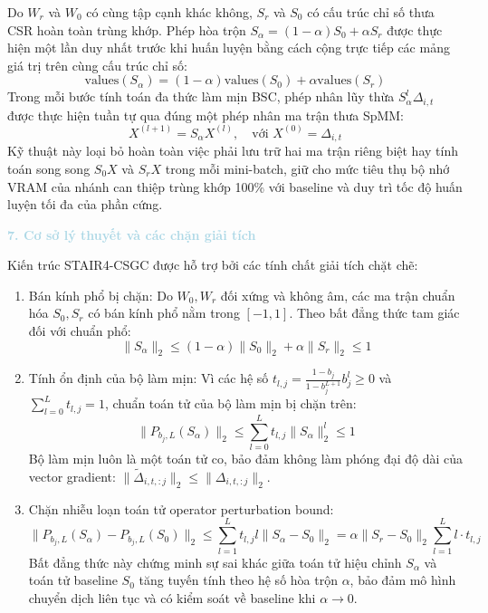 Do $W_r$ và $W_0$ có cùng tập cạnh khác không, $S_r$ và $S_0$ có cấu trúc chỉ số thưa CSR hoàn toàn trùng khớp. Phép hòa trộn $S_\alpha = (1 - \alpha)S_0 + \alpha S_r$ được thực hiện một lần duy nhất trước khi huấn luyện bằng cách cộng trực tiếp các mảng giá trị trên cùng cấu trúc chỉ số:
\begin{equation}
\text{values}(S_\alpha) = (1 - \alpha) \text{values}(S_0) + \alpha \text{values}(S_r)
\end{equation}
Trong mỗi bước tính toán đa thức làm mịn BSC, phép nhân lũy thừa $S_\alpha^l \Delta_{i, t}$ được thực hiện tuần tự qua đúng một phép nhân ma trận thưa SpMM:
\begin{equation}
X^{(l+1)} = S_\alpha X^{(l)}, \quad \text{với } X^{(0)} = \Delta_{i, t}
\end{equation}
Kỹ thuật này loại bỏ hoàn toàn việc phải lưu trữ hai ma trận riêng biệt hay tính toán song song $S_0 X$ và $S_r X$ trong mỗi mini-batch, giữ cho mức tiêu thụ bộ nhớ VRAM của nhánh can thiệp trùng khớp 100\% với baseline và duy trì tốc độ huấn luyện tối đa của phần cứng.

\noindent\textcolor{lightblue}{\textbf{7. Cơ sở lý thuyết và các chặn giải tích}}

Kiến trúc STAIR4-CSGC được hỗ trợ bởi các tính chất giải tích chặt chẽ:
\begin{enumerate}[leftmargin=*]
    \item Bán kính phổ bị chặn: Do $W_0, W_r$ đối xứng và không âm, các ma trận chuẩn hóa $S_0, S_r$ có bán kính phổ nằm trong $[-1, 1]$. Theo bất đẳng thức tam giác đối với chuẩn phổ:
    \begin{equation}
    \|S_\alpha\|_2 \le (1 - \alpha) \|S_0\|_2 + \alpha \|S_r\|_2 \le 1
    \end{equation}
    \item Tính ổn định của bộ làm mịn: Vì các hệ số $t_{l, j} = \frac{1 - b_j}{1 - b_j^{L+1}} b_j^l \ge 0$ và $\sum_{l=0}^L t_{l, j} = 1$, chuẩn toán tử của bộ làm mịn bị chặn trên:
    \begin{equation}
    \|P_{b_j, L}(S_\alpha)\|_2 \le \sum_{l=0}^{L} t_{l, j} \|S_\alpha\|_2^l \le 1
    \end{equation}
    Bộ làm mịn luôn là một toán tử co, bảo đảm không làm phóng đại độ dài của vector gradient: $\|\tilde{\Delta}_{i, t, :j}\|_2 \le \|\Delta_{i, t, :j}\|_2$.
    \item Chặn nhiễu loạn toán tử operator perturbation bound:
    \begin{equation}
    \|P_{b_j, L}(S_\alpha) - P_{b_j, L}(S_0)\|_2 \le \sum_{l=1}^{L} t_{l, j} l \|S_\alpha - S_0\|_2 = \alpha \|S_r - S_0\|_2 \sum_{l=1}^{L} l \cdot t_{l, j}
    \end{equation}
    Bất đẳng thức này chứng minh sự sai khác giữa toán tử hiệu chỉnh $S_\alpha$ và toán tử baseline $S_0$ tăng tuyến tính theo hệ số hòa trộn $\alpha$, bảo đảm mô hình chuyển dịch liên tục và có kiểm soát về baseline khi $\alpha \to 0$.
\end{enumerate}

